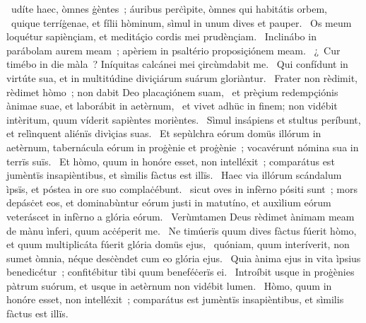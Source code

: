 { }
{%
~udíte haec, òmnes ġèntes~; áuribus perċìpite, òmnes qui habitátis orbem, 
~quique terríġenae, et fílii hòminum, sìmul in unum dives et pauper. 
~Os meum loquétur sapiènçiam, et meditáçio cordis mei prudènçiam. 
~Inclinábo in parábolam aurem meam~; apèriem in psaltério proposiçiónem meam. 
~¿~Cur timébo in die màla~? Iníquitas calcánei mei çircùmdabit me. 
~Qui confídunt in virtúte sua, et in multitúdine diviçiárum suárum gloriàntur. 
~Frater non rèdimit, rèdimet hòmo~; non dabit Deo placaçiónem suam, 
~et prèçium redempçiónis ànimae suae, et laborábit in aetèrnum, 
~et vivet adhüc in finem; non vidébit intèritum, quum víderit sapièntes morièntes. 
~Sìmul insápiens et stultus períbunt, et relìnquent aliénïs divìçias suas. 
~Et sepùlchra eórum domüs illórum in aetèrnum, tabernácula eórum in proġènie et proġènie~; vocavérunt nómina sua in terrïs suïs. 
~Et hòmo, quum in honóre esset, non intelléxit~; comparátus est jumèntïs insapièntibus, et sìmilis fàctus est illïs. 
~Haec via illórum scándalum ìpsïs, et póstea in ore suo complaċébunt. 
~sicut oves in infèrno pósiti sunt~; mors depásċet eos, et dominabùntur eórum justi in matutíno, et auxìlium eórum veteráscet in infèrno a glória eórum. 
~Verùmtamen Deus rèdimet ànimam meam de mànu ìnferi, quum acċéperit me. 
~Ne timúerïs quum dives fàctus fúerit hòmo, et quum multiplicáta fúerit glória domüs ejus, 
~quóniam, quum interíverit, non sumet òmnia, néque desċèndet cum eo glória ejus. 
~Quia ànima ejus in vita ìpsius benedicétur~; confitébitur tìbi quum beneféċerïs ei. 
~Introíbit usque in proġènies pàtrum suórum, et usque in aetèrnum non vidébit lumen. 
~Hòmo, quum in honóre esset, non intelléxit~; comparátus est jumèntïs insapièntibus, et sìmilis fàctus est illïs. 
}

